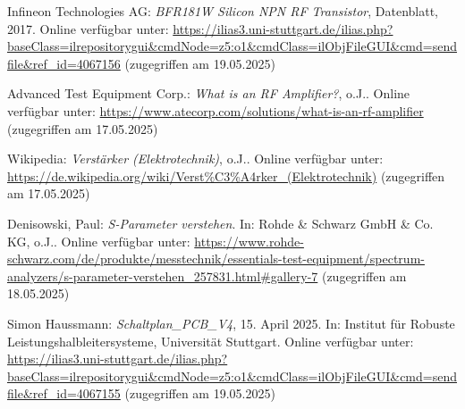 \begin{thebibliography}{1}
Infineon Technologies AG: \emph{BFR181W Silicon NPN RF Transistor}, Datenblatt, 2017. Online verfügbar unter: \url{https://ilias3.uni-stuttgart.de/ilias.php?baseClass=ilrepositorygui&cmdNode=z5:o1&cmdClass=ilObjFileGUI&cmd=sendfile&ref_id=4067156} (zugegriffen am 19.05.2025)

Advanced Test Equipment Corp.: \emph{What is an RF Amplifier?}, o.J.. Online verfügbar unter: \url{https://www.atecorp.com/solutions/what-is-an-rf-amplifier} (zugegriffen am 17.05.2025)

Wikipedia: \emph{Verstärker (Elektrotechnik)}, o.J.. Online verfügbar unter: \url{https://de.wikipedia.org/wiki/Verst%C3%A4rker_(Elektrotechnik)} (zugegriffen am 17.05.2025)

Denisowski, Paul: \emph{S-Parameter verstehen}. In: Rohde \& Schwarz GmbH \& Co. KG, o.J.. Online verfügbar unter: \url{https://www.rohde-schwarz.com/de/produkte/messtechnik/essentials-test-equipment/spectrum-analyzers/s-parameter-verstehen_257831.html#gallery-7} (zugegriffen am 18.05.2025)

Simon Haussmann: \emph{Schaltplan\_PCB\_V4}, 15. April 2025. In: Institut für Robuste Leistungshalbleitersysteme, Universität Stuttgart. Online verfügbar unter: \url{https://ilias3.uni-stuttgart.de/ilias.php?baseClass=ilrepositorygui&cmdNode=z5:o1&cmdClass=ilObjFileGUI&cmd=sendfile&ref_id=4067155} (zugegriffen am 19.05.2025)
\end{thebibliography}

%
\clearpage